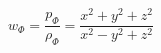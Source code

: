\begin{equation}\label{equaofstate}
 w_{\Phi}=\frac{p_{\Phi}}{\rho_{\Phi}}=\frac{x^2+y^2+z^2}{x^2-y^2+z^2}
\end{equation}

